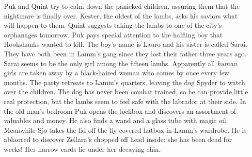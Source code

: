 Puk and Quint try to calm down the panicked children, assuring them that the nightmare is finally over. Kester, the oldest of the lambs, asks his saviors what will happen to them. Quint suggests taking the lambs to one of the city's orphanages tomorrow. Puk pays special attention to the halfling boy that Hookshanks wanted to kill. The boy's name is Lauro and his sister is called Sarai. They have both been in Lamm's gang since they lost their father three years ago. Sarai seems to be the only girl among the fifteen lambs. Apparently all {\itshape human} girls are taken away by a black-haired woman who comes by once every few months. The party retreats to Lamm's quarters, leaving the dog Spyder to watch over the children. The dog has never been combat trained, so he can provide little real protection, but the lambs seem to feel safe with the labrador at their side. In the old man's bedroom Puk opens the lockbox and discovers an assortment of valuables and money. He also finds a wand and a glass tube with magic oil. Meanwhile Sjo takes the lid off the fly-covered hatbox in Lamm's wardrobe. He is abhorred to discover Zellara's chopped off head inside: she has been dead for weeks! Her harrow cards lie under her decaying chin.\\

